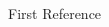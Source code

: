 \documentclass[letterpaper, 10 pt, conference]{ieeeconf}  %
\begin{document}









\begin{thebibliography}{99}

 First Reference 

\end{thebibliography}
\end{document}
